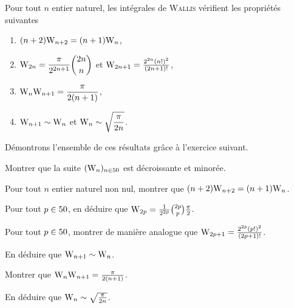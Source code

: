 \begin{theo}{}  Pour tout $n$ entier naturel, les intégrales de \textsc{Wallis} vérifient les propriétés suivantes
\begin{enumerate}[label=(\roman*)]
    \item $(n + 2) \mathrm{W}_{n+2} = (n + 1) \mathrm{W}_n$,  
    \item $\displaystyle \mathrm{W}_{2n} = \frac{\pi}{2^{2n+1}} \binom{2n}{n}$ et $\mathrm{W}_{2n+1} = \frac{2^{2n} (n!)^2}{(2n+1)!}$,
    \item $\displaystyle \mathrm{W}_n \mathrm{W}_{n+1} = \frac{\pi}{2(n+1)}$,
    \item $\mathrm{W}_{n+1} \sim \mathrm{W}_n$ et $\displaystyle \mathrm{W}_n \sim \sqrt{\frac{\pi}{2n}}$.
\end{enumerate}
\end{theo}
Démontrons l'ensemble de ces résultats grâce à l'exercice suivant.
\begin{exercice}\label{exo:propWallis}
\begin{questions}
\item Montrer que la suite $(\mathrm{W}_n)_{n\in50}$ est décroissante et minorée.

\item Pour tout $n$ entier naturel non nul, montrer que $(n + 2) \mathrm{W}_{n+2} = (n + 1) \mathrm{W}_n$.

\item Pour tout $p \in 50$, en déduire que $\mathrm{W}_{2p} = \frac{1}{2^{2p}} \binom{2p}{p} \frac{\pi}{2}$.

\item Pour tout $p \in 50$, montrer de manière analogue que $\mathrm{W}_{2p+1} = \frac{2^{2p} (p!)^2}{(2p+1)!}$.

\item En déduire que $\mathrm{W}_{n+1} \sim \mathrm{W}_n$.

\item Montrer que $\mathrm{W}_n \mathrm{W}_{n+1} = \frac{\pi}{2 (n + 1)}$.

\item En déduire que $\mathrm{W}_n \sim \sqrt{\frac{\pi}{2n}}$.
\end{questions}
\end{exercice}


